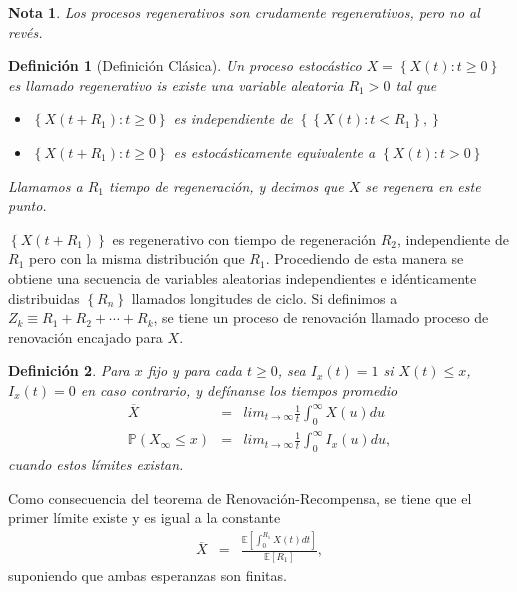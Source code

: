 \documentclass{article}
\newtheorem{Def}{Definición}
\newtheorem{Note}{Nota}
\newcommand{\esp}{\mathbb{E}}
\newcommand{\prob}{\mathbb{P}}
\begin{document}
\begin{Note}
Los procesos regenerativos son crudamente regenerativos, pero no al rev\'es.
\end{Note}
\begin{Def}[Definici\'on Cl\'asica]
Un proceso estoc\'astico $X=\left\{X\left(t\right):t\geq0\right\}$ es llamado regenerativo is existe una variable aleatoria $R_{1}>0$ tal que
\begin{itemize}
\item[i)] $\left\{X\left(t+R_{1}\right):t\geq0\right\}$ es independiente de $\left\{\left\{X\left(t\right):t<R_{1}\right\},\right\}$
\item[ii)] $\left\{X\left(t+R_{1}\right):t\geq0\right\}$ es estoc\'asticamente equivalente a $\left\{X\left(t\right):t>0\right\}$
\end{itemize}

Llamamos a $R_{1}$ tiempo de regeneraci\'on, y decimos que $X$ se regenera en este punto.
\end{Def}

$\left\{X\left(t+R_{1}\right)\right\}$ es regenerativo con tiempo de regeneraci\'on $R_{2}$, independiente de $R_{1}$ pero con la misma distribuci\'on que $R_{1}$. Procediendo de esta manera se obtiene una secuencia de variables aleatorias independientes e id\'enticamente distribuidas $\left\{R_{n}\right\}$ llamados longitudes de ciclo. Si definimos a $Z_{k}\equiv R_{1}+R_{2}+\cdots+R_{k}$, se tiene un proceso de renovaci\'on llamado proceso de renovaci\'on encajado para $X$.




\begin{Def}
Para $x$ fijo y para cada $t\geq0$, sea $I_{x}\left(t\right)=1$ si $X\left(t\right)\leq x$,  $I_{x}\left(t\right)=0$ en caso contrario, y def\'inanse los tiempos promedio
\begin{eqnarray*}
\overline{X}&=&lim_{t\rightarrow\infty}\frac{1}{t}\int_{0}^{\infty}X\left(u\right)du\\
\prob\left(X_{\infty}\leq x\right)&=&lim_{t\rightarrow\infty}\frac{1}{t}\int_{0}^{\infty}I_{x}\left(u\right)du,
\end{eqnarray*}
cuando estos l\'imites existan.
\end{Def}

Como consecuencia del teorema de Renovaci\'on-Recompensa, se tiene que el primer l\'imite  existe y es igual a la constante
\begin{eqnarray*}
\overline{X}&=&\frac{\esp\left[\int_{0}^{R_{1}}X\left(t\right)dt\right]}{\esp\left[R_{1}\right]},
\end{eqnarray*}
suponiendo que ambas esperanzas son finitas.
\end{document}
